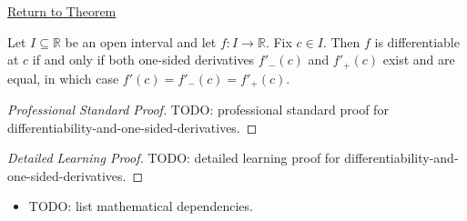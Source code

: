 \newpage
{}
\label{prf:differentiability-and-one-sided-derivatives}

\begin{remark*}[Return]
\hyperref[thm:differentiability-and-one-sided-derivatives]{Return to Theorem}
\end{remark*}

\begin{theorem*}
Let $I \subseteq \mathbb{R}$ be an open interval and let $f : I \to \mathbb{R}$. Fix $c \in I$. Then $f$ is differentiable at $c$ if and only if both one-sided derivatives $f'_-(c)$ and $f'_+(c)$ exist and are equal, in which case $f'(c) = f'_-(c) = f'_+(c)$.
\end{theorem*}

\begin{proof}[Professional Standard Proof]
\LRAProofBodyStart
TODO: professional standard proof for differentiability-and-one-sided-derivatives.
\end{proof}

\begin{proof}[Detailed Learning Proof]
\LRAProofBodyStart
TODO: detailed learning proof for differentiability-and-one-sided-derivatives.
\end{proof}

\begin{remark*}
\end{remark*}

\begin{dependencies}
\begin{itemize}
  \item TODO: list mathematical dependencies.
\end{itemize}
\end{dependencies}

\clearpage
